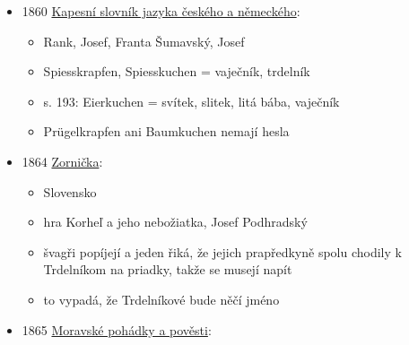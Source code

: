 \begin{itemize}
  \begin{itemize}
  \tightlist
  \item
  \item
     recept na smažený trubičky Dorongfánk
  \item
    překlad:

    \begin{itemize}
    \tightlist
    \item
      567. Dorongové koblihy.
    \item
      Osm lotů čerstvého másla se naseká na čtvrt libry másla, přidá se
      osm lotů cukru, tři loty najemno rozdrcených mandlí, skořice,
      hřebíček a jemně nasekaná citronová kůra; přidá se žloutek z
      jednoho vejce. S jednou polévkovou lžící vína se zadělá těsto; to
      se potom vyválí a nakrájí na kousky asi na prst dlouhé a čtyři
      prsty široké; poté se jednotlivě navinou na železnou trubičku a
      smaží se v horkém tuku. Když jsou všechny upečené, posypou se
      skořicí a cukrem.
    \end{itemize}
  \end{itemize}
\item
  1860
  \href{https://ceskadigitalniknihovna.cz/uuid/uuid:f5239995-7f7b-4b26-8ceb-d90eebcd974c}{Kapesní
  slovník jazyka českého a německého}:

  \begin{itemize}
  \tightlist
  \item
    Rank, Josef, Franta Šumavský, Josef
  \item
    Spiesskrapfen, Spiesskuchen = vaječník, trdelník
  \item
    s. 193: Eierkuchen = svítek, slitek, litá bába, vaječník
  \item
    Prügelkrapfen ani Baumkuchen nemají hesla
  \end{itemize}
\item
  1864
  \href{https://dikda.snk.sk/uuid/uuid:43f40487-25fd-438a-b8b6-e0c25985b2c7}{Zornička}:

  \begin{itemize}
  \tightlist
  \item
    Slovensko
  \item
    hra Korheľ a jeho nebožiatka, Josef Podhradský
  \item
    švagři popíjejí a jeden řiká, že jejich prapředkyně spolu chodily k
    Trdelníkom na priadky, takže se musejí napít
  \item
    to vypadá, že Trdelníkové bude něčí jméno
  \end{itemize}
\item
  1865
  \href{https://www.google.cz/books/edition/Moravske_pohadkya_povesti_M\%C3\%A4hrische_M\%C3\%A4/42qLW6-LrScC?hl=cs&gbpv=1&pg=PA139&printsec=frontcover}{Moravské
  pohádky a pověsti}:


\end{itemize}
